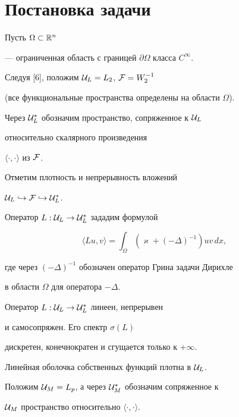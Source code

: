 \section{Постановка задачи}





Пусть $\Omega\subset{\Bbb R}^n$


--- ограниченная область с границей $\partial\Omega$ класса $C^\infty$.


Следуя [6], положим ${\cal U}_L = L_2$, ${\cal F} = W_2^{-1}$


(все функциональные пространства определены на области $\Omega$).


Через ${\cal U}_L^*$ обозначим пространство, сопряженное к ${\cal U}_L$


относительно скалярного произведения


$\langle\cdot,\cdot\rangle$ из ${\cal F}$.


Отметим плотность и непрерывность вложений


${\cal U}_L\hookrightarrow {\cal F}\hookrightarrow {\cal U}_L^*$.


Оператор $L : {\cal U}_L\to {\cal U}_L^* $ зададим формулой


$$


\langle Lu, v\rangle = \int_\Omega (\varkappa + (-\Delta)^{-1}) uv\,dx,


$$


где через $(-\Delta)^{-1}$ обозначен оператор Грина задачи Дирихле


в области $\Omega$ для оператора $-\Delta$.





\begin{lems}


Оператор $L : {\cal U}_L\to {\cal U}_L^* $ линеен, непрерывен


и самосопряжен. Его спектр $\sigma(L)$


дискретен, конечнократен и сгущается только к $+\infty$.


Линейная оболочка собственных функций плотна в ${\cal U}_L$.


\end{lems}





Положим ${\cal U}_M = L_p$, а через ${\cal U}_M^*$ обозначим сопряженное к


${\cal U}_M$ пространство относительно $\langle\cdot,\cdot\rangle$.


